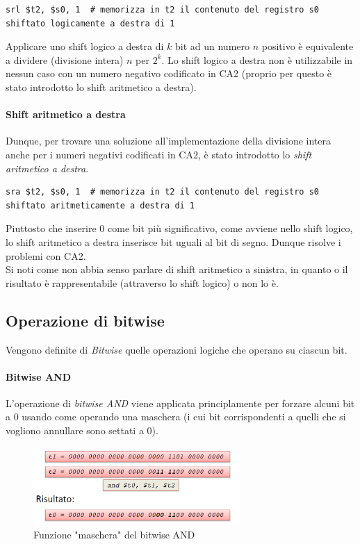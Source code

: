 \documentclass[class=book, crop=false]{standalone}
\begin{document}
\begin{verbatim}
srl $t2, $s0, 1  # memorizza in t2 il contenuto del registro s0 shiftato logicamente a destra di 1
\end{verbatim}

Applicare uno shift logico a destra di \(k\) bit ad un numero \(n\) positivo è equivalente a dividere (divisione intera) \(n\) per \(2^k\). Lo shift logico a destra non è utilizzabile in nessun caso con un numero negativo codificato in CA2 (proprio per questo è stato introdotto lo shift aritmetico a destra).

\paragraph{Shift aritmetico a destra}
Dunque, per trovare una soluzione all'implementazione della divisione intera anche per i numeri negativi codificati in CA2, è stato introdotto lo \emph{shift aritmetico a destra}.

\begin{verbatim}
sra $t2, $s0, 1  # memorizza in t2 il contenuto del registro s0 shiftato aritmeticamente a destra di 1
\end{verbatim}

Piuttosto che inserire 0 come bit più significativo, come avviene nello shift logico, lo shift aritmetico a destra inserisce bit uguali al bit di segno. Dunque risolve i problemi con CA2.\\
Si noti come non abbia senso parlare di shift aritmetico a sinistra, in quanto o il risultato è rappresentabile (attraverso lo shift logico) o non lo è.

\subsection{Operazione di bitwise}
Vengono definite di \emph{Bitwise} quelle operazioni logiche che operano su ciascun bit.

\paragraph{Bitwise AND}
L'operazione di \emph{bitwise AND} viene applicata principlamente per forzare alcuni bit a 0 usando come operando una maschera (i cui bit corrispondenti a quelli che si vogliono annullare sono settati a 0).
\begin{figure}[H]
	\centering
	\includegraphics[width=0.7\textwidth,keepaspectratio]{bitwise_and}
	\caption{Funzione "maschera" del bitwise AND}
\end{figure}
\end{document}
